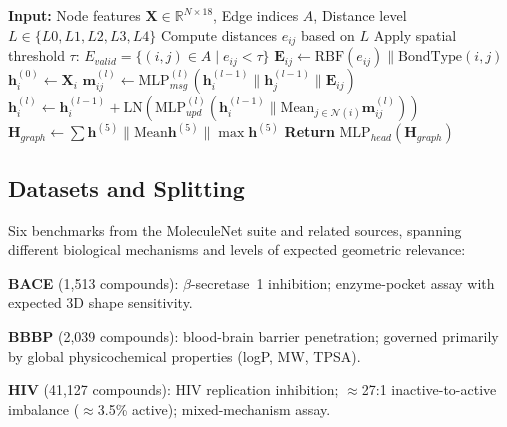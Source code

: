 \documentclass[pdflatex,sn-vancouver-num]{sn-jnl}%
\theoremstyle{thmstyleone}%
\theoremstyle{thmstyletwo}%
\theoremstyle{thmstylethree}%
\begin{document}
\begin{algorithm}[h]
\caption{Flexi-JEGNN Forward Pass}
\label{alg:flexi}
\begin{algorithmic}[1]
\State \textbf{Input:} Node features $\mathbf{X} \in \mathbb{R}^{N \times 18}$, Edge indices $A$, Distance level $L \in \{L0, L1, L2, L3, L4\}$
\State Compute distances $e_{ij}$ based on $L$
\State Apply spatial threshold $\tau$: $E_{valid} = \{(i,j) \in A \mid e_{ij} < \tau\}$
    \State $\mathbf{E}_{ij} \leftarrow \text{RBF}(e_{ij}) \parallel \text{BondType}(i,j)$
\EndFor
\State $\mathbf{h}^{(0)}_i \leftarrow \mathbf{X}_i$
    \State $\mathbf{m}_{ij}^{(l)} \leftarrow \text{MLP}^{(l)}_{msg}(\mathbf{h}^{(l-1)}_i \parallel \mathbf{h}^{(l-1)}_j \parallel \mathbf{E}_{ij})$
    \State $\mathbf{h}^{(l)}_i \leftarrow \mathbf{h}^{(l-1)}_i + \text{LN}(\text{MLP}^{(l)}_{upd}(\mathbf{h}^{(l-1)}_i \parallel \text{Mean}_{j \in \mathcal{N}(i)} \mathbf{m}_{ij}^{(l)}))$
\EndFor
\State $\mathbf{H}_{graph} \leftarrow \sum \mathbf{h}^{(5)} \parallel \text{Mean} \mathbf{h}^{(5)} \parallel \max \mathbf{h}^{(5)}$
\State \textbf{Return} $\text{MLP}_{head}(\mathbf{H}_{graph})$ 
\end{algorithmic}
\end{algorithm}





\subsection{Datasets and Splitting}

Six benchmarks from the MoleculeNet suite \cite{wu2018moleculenet} and
related sources, spanning different biological mechanisms and levels of
expected geometric relevance:

\textbf{BACE} (1,513 compounds): $\beta$-secretase~1 inhibition;
enzyme-pocket assay with expected 3D shape sensitivity.

\textbf{BBBP} (2,039 compounds): blood-brain barrier penetration; governed
primarily by global physicochemical properties (logP, MW, TPSA).

\textbf{HIV} (41,127 compounds): HIV replication inhibition; $\approx$27:1
inactive-to-active imbalance ($\approx$3.5\% active); mixed-mechanism assay.
\end{document}
